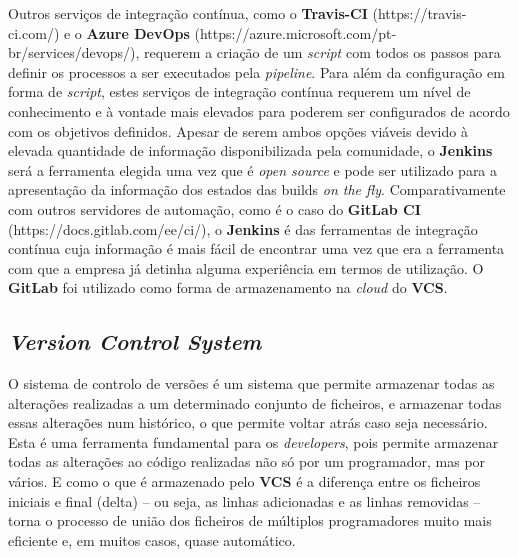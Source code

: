 \hspace{1cm}Outros serviços de integração contínua, como o \textbf{Travis-CI} (https://travis-ci.com/) e o \textbf{Azure DevOps} (https://azure.microsoft.com/pt-br/services/devops/), requerem a criação de um \textit{script} com todos os passos para definir os processos a ser executados pela \textit{pipeline}. Para além da configuração em forma de \textit{script}, estes serviços de integração contínua requerem um nível de conhecimento e à vontade mais elevados para poderem ser configurados de acordo com os objetivos definidos. Apesar de serem ambos opções viáveis devido à elevada quantidade de informação disponibilizada pela comunidade,  o \textbf{Jenkins} será a ferramenta elegida uma vez que é \textit{open source} e pode ser utilizado para a apresentação da informação dos estados das builds \textit{on the fly}. Comparativamente com outros servidores de automação, como é o caso do \textbf{GitLab CI} (https://docs.gitlab.com/ee/ci/), o \textbf{Jenkins} é das ferramentas de integração contínua cuja informação é mais fácil de encontrar uma vez que era a ferramenta com que a empresa já detinha alguma experiência em termos de utilização. O \textbf{GitLab} foi utilizado como forma de armazenamento na \textit{cloud} do \textbf{VCS}.


\subsection{\textit{Version Control System}}
\hspace{1cm}O sistema de controlo de versões é um sistema que permite armazenar todas as alterações realizadas a um determinado conjunto de ficheiros, e armazenar todas essas alterações num histórico, o que permite voltar atrás caso seja necessário. Esta é uma ferramenta fundamental para os \textit{developers}, pois permite armazenar todas as alterações ao código realizadas não só por um programador, mas por vários. E como o que é armazenado pelo \textbf{VCS} é a diferença entre os ficheiros iniciais e final (delta) -- ou seja, as linhas adicionadas e as linhas removidas -- torna o processo de união dos ficheiros de múltiplos programadores muito mais eficiente e, em muitos casos, quase automático.

